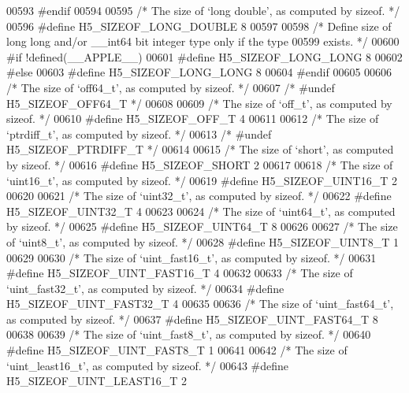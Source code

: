 \begin{DoxyCode}
{00593 \textcolor{preprocessor}{#endif}
00594 
00595 \textcolor{comment}{/* The size of `long double', as computed by sizeof. */}
00596 \textcolor{preprocessor}{#define H5\_SIZEOF\_LONG\_DOUBLE 8}
00597 
00598 \textcolor{comment}{/* Define size of long long and/or \_\_int64 bit integer type only if the type}
00599 \textcolor{comment}{   exists.  */}
00600 \textcolor{preprocessor}{#if !defined(\_\_APPLE\_\_)}
00601 \textcolor{preprocessor}{ #define H5\_SIZEOF\_LONG\_LONG 8}
00602 \textcolor{preprocessor}{#else}
00603 \textcolor{preprocessor}{ #define H5\_SIZEOF\_LONG\_LONG 8}
00604 \textcolor{preprocessor}{#endif}
00605 
00606 \textcolor{comment}{/* The size of `off64\_t', as computed by sizeof. */}
00607 \textcolor{comment}{/* #undef H5\_SIZEOF\_OFF64\_T */}
00608 
00609 \textcolor{comment}{/* The size of `off\_t', as computed by sizeof. */}
00610 \textcolor{preprocessor}{#define H5\_SIZEOF\_OFF\_T 4}
00611 
00612 \textcolor{comment}{/* The size of `ptrdiff\_t', as computed by sizeof. */}
00613 \textcolor{comment}{/* #undef H5\_SIZEOF\_PTRDIFF\_T */}
00614 
00615 \textcolor{comment}{/* The size of `short', as computed by sizeof. */}
00616 \textcolor{preprocessor}{#define H5\_SIZEOF\_SHORT 2}
00617 
00618 \textcolor{comment}{/* The size of `uint16\_t', as computed by sizeof. */}
00619 \textcolor{preprocessor}{#define H5\_SIZEOF\_UINT16\_T 2}
00620 
00621 \textcolor{comment}{/* The size of `uint32\_t', as computed by sizeof. */}
00622 \textcolor{preprocessor}{#define H5\_SIZEOF\_UINT32\_T 4}
00623 
00624 \textcolor{comment}{/* The size of `uint64\_t', as computed by sizeof. */}
00625 \textcolor{preprocessor}{#define H5\_SIZEOF\_UINT64\_T 8}
00626 
00627 \textcolor{comment}{/* The size of `uint8\_t', as computed by sizeof. */}
00628 \textcolor{preprocessor}{#define H5\_SIZEOF\_UINT8\_T 1}
00629 
00630 \textcolor{comment}{/* The size of `uint\_fast16\_t', as computed by sizeof. */}
00631 \textcolor{preprocessor}{#define H5\_SIZEOF\_UINT\_FAST16\_T 4}
00632 
00633 \textcolor{comment}{/* The size of `uint\_fast32\_t', as computed by sizeof. */}
00634 \textcolor{preprocessor}{#define H5\_SIZEOF\_UINT\_FAST32\_T 4}
00635 
00636 \textcolor{comment}{/* The size of `uint\_fast64\_t', as computed by sizeof. */}
00637 \textcolor{preprocessor}{#define H5\_SIZEOF\_UINT\_FAST64\_T 8}
00638 
00639 \textcolor{comment}{/* The size of `uint\_fast8\_t', as computed by sizeof. */}
00640 \textcolor{preprocessor}{#define H5\_SIZEOF\_UINT\_FAST8\_T 1}
00641 
00642 \textcolor{comment}{/* The size of `uint\_least16\_t', as computed by sizeof. */}
00643 \textcolor{preprocessor}{#define H5\_SIZEOF\_UINT\_LEAST16\_T 2}
}
\end{DoxyCode}
